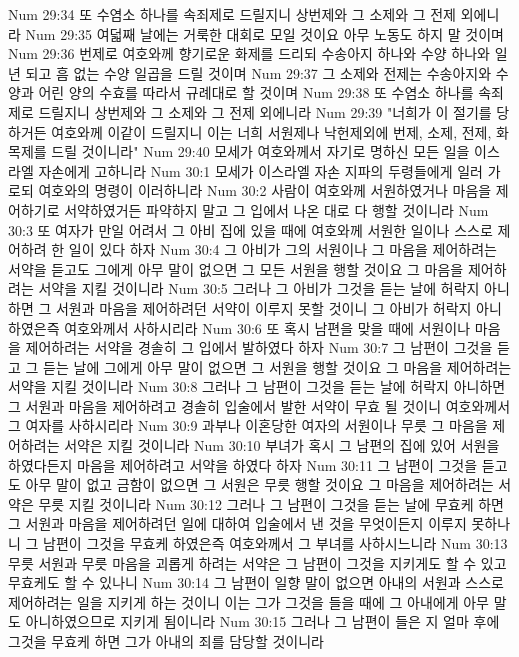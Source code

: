 Num 29:34  또 수염소 하나를 속죄제로 드릴지니 상번제와 그 소제와 그 전제 외에니라
Num 29:35  여덟째 날에는 거룩한 대회로 모일 것이요 아무 노동도 하지 말 것이며
Num 29:36  번제로 여호와께 향기로운 화제를 드리되 수송아지 하나와 수양 하나와 일 년 되고 흠 없는 수양 일곱을 드릴 것이며
Num 29:37  그 소제와 전제는 수송아지와 수양과 어린 양의 수효를 따라서 규례대로 할 것이며
Num 29:38  또 수염소 하나를 속죄제로 드릴지니 상번제와 그 소제와 그 전제 외에니라
Num 29:39  "너희가 이 절기를 당하거든 여호와께 이같이 드릴지니 이는 너희 서원제나 낙헌제외에 번제, 소제, 전제, 화목제를 드릴 것이니라"
Num 29:40  모세가 여호와께서 자기로 명하신 모든 일을 이스라엘 자손에게 고하니라
Num 30:1  모세가 이스라엘 자손 지파의 두령들에게 일러 가로되 여호와의 명령이 이러하니라
Num 30:2  사람이 여호와께 서원하였거나 마음을 제어하기로 서약하였거든 파약하지 말고 그 입에서 나온 대로 다 행할 것이니라
Num 30:3  또 여자가 만일 어려서 그 아비 집에 있을 때에 여호와께 서원한 일이나 스스로 제어하려 한 일이 있다 하자
Num 30:4  그 아비가 그의 서원이나 그 마음을 제어하려는 서약을 듣고도 그에게 아무 말이 없으면 그 모든 서원을 행할 것이요 그 마음을 제어하려는 서약을 지킬 것이니라
Num 30:5  그러나 그 아비가 그것을 듣는 날에 허락지 아니하면 그 서원과 마음을 제어하려던 서약이 이루지 못할 것이니 그 아비가 허락지 아니하였은즉 여호와께서 사하시리라
Num 30:6  또 혹시 남편을 맞을 때에 서원이나 마음을 제어하려는 서약을 경솔히 그 입에서 발하였다 하자
Num 30:7  그 남편이 그것을 듣고 그 듣는 날에 그에게 아무 말이 없으면 그 서원을 행할 것이요 그 마음을 제어하려는 서약을 지킬 것이니라
Num 30:8  그러나 그 남편이 그것을 듣는 날에 허락지 아니하면 그 서원과 마음을 제어하려고 경솔히 입술에서 발한 서약이 무효 될 것이니 여호와께서 그 여자를 사하시리라
Num 30:9  과부나 이혼당한 여자의 서원이나 무릇 그 마음을 제어하려는 서약은 지킬 것이니라
Num 30:10  부녀가 혹시 그 남편의 집에 있어 서원을 하였다든지 마음을 제어하려고 서약을 하였다 하자
Num 30:11  그 남편이 그것을 듣고도 아무 말이 없고 금함이 없으면 그 서원은 무릇 행할 것이요 그 마음을 제어하려는 서약은 무릇 지킬 것이니라
Num 30:12  그러나 그 남편이 그것을 듣는 날에 무효케 하면 그 서원과 마음을 제어하려던 일에 대하여 입술에서 낸 것을 무엇이든지 이루지 못하나니 그 남편이 그것을 무효케 하였은즉 여호와께서 그 부녀를 사하시느니라
Num 30:13  무릇 서원과 무릇 마음을 괴롭게 하려는 서약은 그 남편이 그것을 지키게도 할 수 있고 무효케도 할 수 있나니
Num 30:14  그 남편이 일향 말이 없으면 아내의 서원과 스스로 제어하려는 일을 지키게 하는 것이니 이는 그가 그것을 들을 때에 그 아내에게 아무 말도 아니하였으므로 지키게 됨이니라
Num 30:15  그러나 그 남편이 들은 지 얼마 후에 그것을 무효케 하면 그가 아내의 죄를 담당할 것이니라
